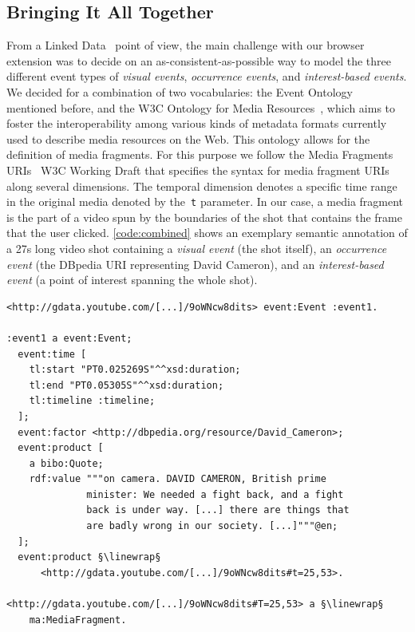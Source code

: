 \documentclass[runningheads,a4paper]{llncs}
\newcommand{\linewrap}{\raisebox{-.6ex}{\textcolor{grey}{$\hookleftarrow$}}}
\begin{document}
\subsection{Bringing It All Together}
From a Linked Data~\cite{Hausenblas:LDOW09} point of view, the main challenge with our browser extension was to decide on an as-consistent-as-possible way to model the three different event types of \emph{visual events}, \emph{occurrence events}, and \emph{interest-based events}. We decided for a combination of two vocabularies: the Event Ontology~\cite{Raimond:Event} mentioned before, and the W3C Ontology for Media Resources~\cite{mediaontology}, which aims to foster the interoperability among various kinds of metadata formats currently used to describe media resources on the Web. This ontology allows for the definition of media fragments. For this purpose we follow the Media Fragments URIs~\cite{W3C:MediaFrags} W3C Working Draft that specifies the syntax for media fragment URIs along several dimensions. The temporal dimension denotes a specific time range in the original media denoted by the~\texttt{t} parameter. In our case, a media fragment is the part of a video spun by the boundaries of the shot that contains the frame that the user clicked. \autoref{code:combined} shows an exemplary semantic annotation of a 27s long video shot containing a \emph{visual event} (the shot itself), an \emph{occurrence event} (the DBpedia URI representing David Cameron), and an \emph{interest-based event} (a point of interest spanning the whole shot). 

\begin{lstlisting}[caption=Semantic annotation of a 27s long video shot (\emph{visual event}) showing David Cameron (\emph{occurrence event}) talk about the London riots. The shot is also a point of interest generated by a click of a YouTube user (\emph{interest-based event})., label=code:combined, float=h, escapechar=§]
<http://gdata.youtube.com/[...]/9oWNcw8dits> event:Event :event1.

:event1 a event:Event;
  event:time [
    tl:start "PT0.025269S"^^xsd:duration;
    tl:end "PT0.05305S"^^xsd:duration;
    tl:timeline :timeline;
  ];
  event:factor <http://dbpedia.org/resource/David_Cameron>;
  event:product [
    a bibo:Quote;
    rdf:value """on camera. DAVID CAMERON, British prime
              minister: We needed a fight back, and a fight
              back is under way. [...] there are things that
              are badly wrong in our society. [...]"""@en;
  ];
  event:product §\linewrap§
      <http://gdata.youtube.com/[...]/9oWNcw8dits#t=25,53>.
      
<http://gdata.youtube.com/[...]/9oWNcw8dits#T=25,53> a §\linewrap§
    ma:MediaFragment.
\end{lstlisting} 
\end{document}

